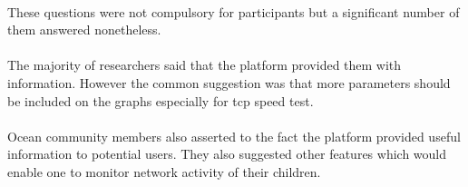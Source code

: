 \paragraph{}
These questions were not compulsory for participants but a significant number of them answered nonetheless. 
\paragraph{} 
The majority of researchers said that the platform provided them with information. However the common suggestion was that more parameters should be included on the graphs especially for tcp speed test.
\paragraph{}
Ocean community members also asserted to the fact the platform provided useful information to potential users. They also suggested other features which would enable one to monitor network activity of their children. 
